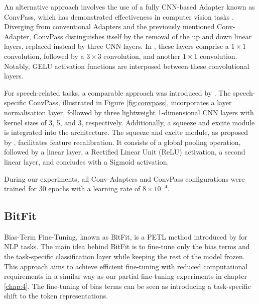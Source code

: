 An alternative approach involves the use of a fully CNN-based Adapter known as ConvPass, which has demonstrated effectiveness in computer vision tasks \cite{jie2022convolutional}. Diverging from conventional Adapters and the previously mentioned Conv-Adapter, ConvPass distinguishes itself by the removal of the up and down linear layers, replaced instead by three CNN layers. In \cite{jie2022convolutional}, these layers comprise a $1 \times 1$ convolution, followed by a $3 \times 3$ convolution, and another $1 \times 1$ convolution. Notably, GELU activation functions are interposed between these convolutional layers.

For speech-related tasks, a comparable approach was introduced by \cite{li2023evaluating}. The speech-specific ConvPass, illustrated in Figure \ref{fig:convpass}, incorporates a layer normalisation layer, followed by three lightweight 1-dimensional CNN layers with kernel sizes of 3, 5, and 3, respectively. Additionally, a squeeze and excite module is integrated into the architecture. The squeeze and excite module, as proposed by \cite{hu2018squeeze}, facilitates feature recalibration. It consists of a global pooling operation, followed by a linear layer, a Rectified Linear Unit (ReLU) activation, a second linear layer, and concludes with a Sigmoid activation.

During our experiments, all Conv-Adapters and ConvPass configurations were trained for 30 epochs with a learning rate of $8 \times 10^{-4}$.

\subsection{BitFit}
Bias-Term Fine-Tuning, known as BitFit, is a PETL method introduced by \cite{ben-zaken-etal-2022-bitfit} for NLP tasks. The main idea behind BitFit is to fine-tune only the bias terms and the task-specific classification layer while keeping the rest of the model frozen. This approach aims to achieve efficient fine-tuning with reduced computational requirements in a similar way as our partial fine-tuning experiments in chapter \ref{chap:4}. The fine-tuning of bias terms can be seen as introducing a task-specific shift to the token representations.

